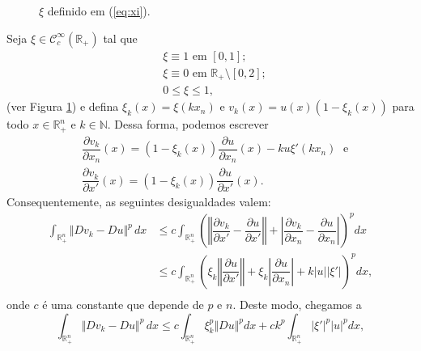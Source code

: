 \documentclass[a4paper, 11pt]{book}
\theoremstyle{definition}
\newcommand{\bN}{\mathbb{N}}
\newcommand{\bR}{\mathbb{R}}
\newcommand{\cC}{\mathcal{C}}
\begin{document}
\begin{prf}
\begin{figure}
        \caption{$\xi$ definido em (\ref{eq:xi}).}
        \label{fig:xi}
    \end{figure}
    Seja $\xi \in \cC^{\infty}_c(\bR_+)$ tal que
    \begin{equation} \label{eq:xi}
        \begin{aligned}
            &\xi \equiv 1 \text{ em } [0,1];\\
            &\xi \equiv 0 \text{ em } \bR_+ \setminus [0,2];\\
            &0 \leqslant \xi \leqslant 1,
        \end{aligned}
    \end{equation}
    (ver Figura \ref{fig:xi}) e defina $\xi_k(x) = \xi(kx_n)$ e $v_k(x) = u(x) (1 - \xi_k(x))$ para todo $x \in \bR^n_+$ e $k \in \bN$. Dessa forma, podemos escrever
    \[
        \begin{aligned}
            &\dfrac{\partial v_k}{\partial x_n}(x) = (1 - \xi_k(x))\dfrac{\partial u}{\partial x_n}(x) - ku\xi'(kx_n) \;\text{ e}\\
            &\dfrac{\partial v_k}{\partial x'}(x) = (1-\xi_k(x))\dfrac{\partial u}{\partial x'}(x).
        \end{aligned}
    \]
    Consequentemente, as seguintes desigualdades valem:
    \[
        \begin{aligned}
            \int_{\bR^n_+} \Vert Dv_k - Du \Vert^p \,dx &\leqslant c \int_{\bR^n_+} \left( \left\Vert \dfrac{\partial v_k}{\partial x'} - \dfrac{\partial u}{\partial x'} \right\Vert + \left| \dfrac{\partial v_k}{\partial x_n} - \dfrac{\partial u}{\partial x_n} \right| \right)^p dx\\
            &\leqslant c  \int_{\bR^n_+} \left( \xi_k\left\Vert \dfrac{\partial u}{\partial x'} \right\Vert + \xi_k \left| \dfrac{\partial u}{\partial x_n}\right| + k |u| |\xi'|  \right)^p dx,\\ 
        \end{aligned}
    \]
    onde $c$ é uma constante que depende de $p$ e $n$. Deste modo, chegamos a
    \begin{equation} \label{eq:asxa}
        \int_{\bR^n_+} \Vert Dv_k - Du \Vert^p \,dx \leqslant c \int_{\bR^n_+} \xi_k^p \Vert Du \Vert^p dx + ck^p \int_{\bR^n_+} |\xi'|^p |u|^p dx,
    \end{equation}

\end{prf}
\end{document}
